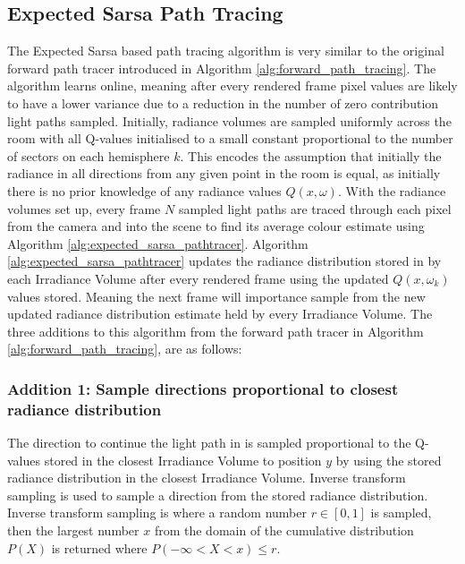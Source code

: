 \documentclass[../dissertation.tex]{subfiles}
\begin{document}
\subsection{Expected Sarsa Path Tracing}
\label{sec:expected_sarsa_path_tracer}

The Expected Sarsa based path tracing algorithm is very similar to the original forward path tracer introduced in Algorithm \ref{alg:forward_path_tracing}. The algorithm learns online, meaning after every rendered frame pixel values are likely to have a lower variance due to a reduction in the number of zero contribution light paths sampled. Initially, radiance volumes are sampled uniformly across the room with all Q-values initialised to a small constant proportional to the number of sectors on each hemisphere $k$. This encodes the assumption that initially the radiance in all directions from any given point in the room is equal, as initially there is no prior knowledge of any radiance values $Q(x, \omega)$. With the radiance volumes set up, every frame $N$ sampled light paths are traced through each pixel from the camera and into the scene to find its average colour estimate using Algorithm \ref{alg:expected_sarsa_pathtracer}. Algorithm \ref{alg:expected_sarsa_pathtracer} updates the radiance distribution stored in by each Irradiance Volume after every rendered frame using the updated $Q(x, \omega_k)$ values stored. Meaning the next frame will importance sample from the new updated radiance distribution estimate held by every Irradiance Volume. The three additions to this algorithm from the forward path tracer in Algorithm \ref{alg:forward_path_tracing}, are as follows:

\subsubsection*{Addition 1: Sample directions proportional to closest radiance distribution}
The direction to continue the light path in is sampled proportional to the Q-values stored in the closest Irradiance Volume to position $y$ by using the stored radiance distribution in the closest Irradiance Volume.  Inverse transform sampling \cite{devroye2006nonuniform} is used to sample a direction from the stored radiance distribution. Inverse transform sampling is where a random number $r \in [0,1]$ is sampled, then the largest number $x$ from the domain of the cumulative distribution $P(X)$ is returned where $ P(-\infty < X < x) \leq r$. 
\end{document}
